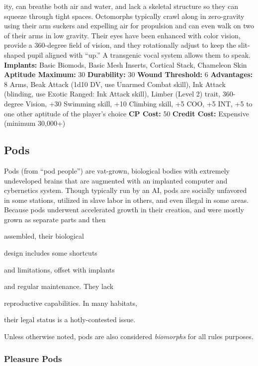 ity, can breathe both air and water, and lack a 
skeletal structure so they can squeeze through tight 
spaces. Octomorphs typically crawl along in zero-gravity
using their arm suckers and expelling air for
propulsion and can even walk on two of their arms 
in low gravity. Their eyes have been enhanced with 
color vision, provide a 360-degree field of vision, and 
they rotationally adjust to keep the slit-shaped pupil 
aligned with ``up.'' A transgenic vocal system allows 
them to speak.
\textbf{Implants: }Basic Biomods, Basic Mesh Inserts, Cortical 
Stack, Chameleon Skin
\textbf{Aptitude Maximum: }30
\textbf{Durability:} 30
\textbf{Wound Threshold:} 6
\textbf{Advantages:} 8 Arms, Beak Attack (1d10 DV, use 
Unarmed Combat skill), Ink Attack (blinding, use 
Exotic Ranged: Ink Attack skill), Limber (Level 2) 
trait, 360-degree Vision, +30 Swimming skill, +10 
Climbing skill, +5 COO, +5 INT, +5 to one other 
aptitude of the player's choice
\textbf{CP Cost:} 50
\textbf{Credit Cost: }Expensive (minimum 30,000+)

\subsection{Pods}

Pods (from ``pod people'') are vat-grown, biological 
bodies with extremely undeveloped brains that are 
augmented with an implanted computer and cybernetics
system. Though typically run by an AI, pods are
socially unfavored in some stations, utilized in slave 
labor in others, and even illegal in some areas. Because 
pods underwent accelerated growth in their creation, 
and were mostly grown as separate parts and then 

assembled, their biological 

design includes some shortcuts 

and limitations, offset with implants 

and regular maintenance. They lack 

reproductive capabilities. In many habitats, 

their legal status is a hotly-contested issue.

Unless otherwise noted, pods are also considered
\textit{biomorphs} for all rules purposes.

\subsubsection{Pleasure Pods}

